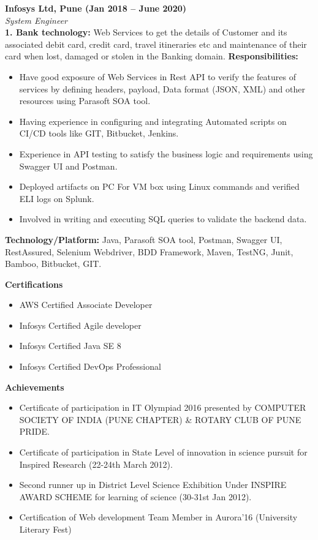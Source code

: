 \documentclass[a4paper,10pt]{article}
\begin{document}
\vspace{0.5cm}

\textbf{Infosys Ltd, Pune (Jan 2018 – June 2020)} \\
\textit{System Engineer} \\
\textbf{1. Bank technology:} Web Services to get the details of Customer and its associated debit card, credit card, travel itineraries etc and maintenance of their card when lost, damaged or stolen in the Banking domain.
\textbf{Responsibilities:}
\begin{itemize}
    \item Have good exposure of Web Services in Rest API to verify the features of services by defining headers, payload, Data format (JSON, XML) and other resources using Parasoft SOA tool.
    \item Having experience in configuring and integrating Automated scripts on CI/CD tools like GIT, Bitbucket, Jenkins.
    \item Experience in API testing to satisfy the business logic and requirements using Swagger UI and Postman.
    \item Deployed artifacts on PC For VM box using Linux commands and verified ELI logs on Splunk.
    \item Involved in writing and executing SQL queries to validate the backend data.
\end{itemize}
\textbf{Technology/Platform:} Java, Parasoft SOA tool, Postman, Swagger UI, RestAssured, Selenium Webdriver, BDD Framework, Maven, TestNG, Junit, Bamboo, Bitbucket, GIT.

\vspace{0.5cm}

\textbf{Certifications}

\begin{itemize}
    \item AWS Certified Associate Developer
    \item Infosys Certified Agile developer
    \item Infosys Certified Java SE 8
    \item Infosys Certified DevOps Professional
\end{itemize}

\vspace{0.5cm}

\textbf{Achievements}

\begin{itemize}
    \item Certificate of participation in IT Olympiad 2016 presented by COMPUTER SOCIETY OF INDIA (PUNE CHAPTER) & ROTARY CLUB OF PUNE PRIDE.
    \item Certificate of participation in State Level of innovation in science pursuit for Inspired Research (22-24th March 2012).
    \item Second runner up in District Level Science Exhibition Under INSPIRE AWARD SCHEME for learning of science (30-31st Jan 2012).
    \item Certification of Web development Team Member in Aurora’16 (University Literary Fest)
\end{itemize}
\end{document}
